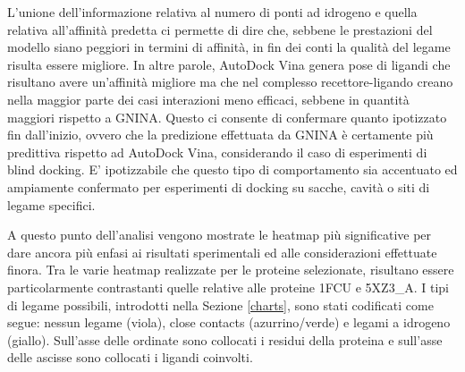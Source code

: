 L'unione dell'informazione relativa al numero di ponti ad idrogeno e quella relativa all'affinità predetta ci permette di dire che, sebbene le prestazioni del modello siano peggiori in termini di affinità, in fin dei conti la qualità del legame risulta essere migliore. In altre parole, AutoDock Vina genera pose di ligandi che risultano avere un'affinità migliore ma che nel complesso recettore-ligando creano nella maggior parte dei casi interazioni meno efficaci, sebbene in quantità maggiori rispetto a GNINA. 
Questo ci consente di confermare quanto ipotizzato fin dall'inizio, ovvero che la predizione effettuata da GNINA è certamente più predittiva rispetto ad AutoDock Vina, considerando il caso di esperimenti di blind docking.
E' ipotizzabile che questo tipo di comportamento sia accentuato ed ampiamente confermato per esperimenti di docking su sacche, cavità o siti di legame specifici.





A questo punto dell'analisi vengono mostrate le heatmap più significative per dare ancora più enfasi ai risultati sperimentali ed alle considerazioni effettuate finora. Tra le varie heatmap realizzate per le proteine selezionate, risultano essere particolarmente contrastanti quelle relative alle proteine 1FCU e 5XZ3\_A. 
I tipi di legame possibili, introdotti nella Sezione \ref{charts}, sono stati codificati come segue: nessun legame (viola), close contacts (azurrino/verde) e legami a idrogeno (giallo). Sull'asse delle ordinate sono collocati i residui della proteina e sull'asse delle ascisse sono collocati i ligandi coinvolti.  


